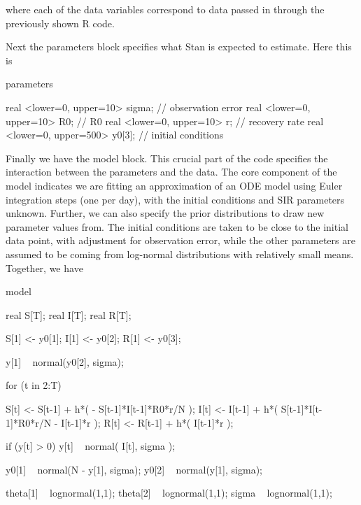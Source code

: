     where each of the data variables correspond to data passed in through the previously shown R code.

    Next the parameters block specifies what Stan is expected to estimate. Here this is

    \begin{Stan}
    parameters {

        real <lower=0, upper=10>    sigma;  // observation error
        real <lower=0, upper=10>    R0;     // R0
        real <lower=0, upper=10>    r;      // recovery rate
        real <lower=0, upper=500>   y0[3];  // initial conditions

    }
    \end{Stan}

    Finally we have the model block. This crucial part of the code specifies the interaction between the parameters and the data. The core component of the model indicates we are fitting an approximation of an ODE model using Euler integration steps (one per day), with the initial conditions and SIR parameters unknown. Further, we can also specify the prior distributions to draw new parameter values from. The initial conditions are taken to be close to the initial data point, with adjustment for observation error, while the other parameters are assumed to be coming from log-normal distributions with relatively small means. Together, we have

    \begin{Stan}
    model {

        real S[T];
        real I[T];
        real R[T];

        S[1] <- y0[1];
        I[1] <- y0[2];
        R[1] <- y0[3];
        
        y[1] ~ normal(y0[2], sigma);

        for (t in 2:T) {

            S[t] <- S[t-1] + h*( - S[t-1]*I[t-1]*R0*r/N );
            I[t] <- I[t-1] + h*( S[t-1]*I[t-1]*R0*r/N  - I[t-1]*r );
            R[t] <- R[t-1] + h*( I[t-1]*r );
            
            if (y[t] > 0) {
                y[t] ~ normal( I[t], sigma );
            }

        }
        
        y0[1] ~ normal(N - y[1], sigma);
        y0[2] ~ normal(y[1], sigma);
        
        theta[1]    ~ lognormal(1,1);
        theta[2]    ~ lognormal(1,1);
        sigma       ~ lognormal(1,1);
            
    }
    \end{Stan}

